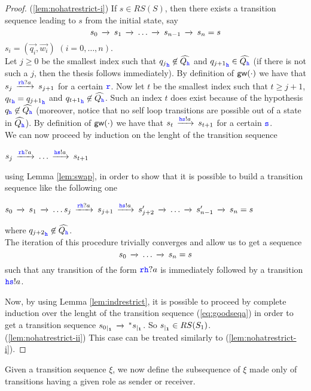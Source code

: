 \begin{proof}
(\ref{lem:nohatrestrict-i})
If $s \in RS(S)$, then there exists a transition sequence leading to $s$ from the initial state, say
$$s_0\lts{}s_1\lts{} \ldots\lts{} s_{n-1}\lts{}s_n=s$$
$s_i = (\vec{q_i},\vec{w_i})$ $(i=0,\ldots,n)$.\\
Let $j \geq 0$ be the smallest index such that ${q_j}_\HH\not\in \widehat{Q_\HH}$ and  ${q_{j+1}}_\HH\in \widehat{Q_\HH}$
(if there is not such a $j$, then the thesis follows immediately).
By definition of $\gateway{\cdot}$ we have that $s_j\lts{\ttr\HH?a} s_{j+1}$ for a certain $\ttr$.
Now let $t$ be the smallest index such that  $t\geq j+1$, ${q_t}_\HH = {q_{j+1}}_\HH$ and ${q_{t+1}}_\HH\not\in \widehat{Q_\HH}$.
Such an index $t$ does exist because of the hypothesis $q_\HH\not\in\widehat{Q_\HH}$
(moreover, notice that no self loop transitions are possible out of a state in $\widehat{Q_\HH}$).
By definition of $\gateway{\cdot}$ we have that $s_{t}\lts{\HH\tts!a} s_{t+1}$ for a certain $\tts$.\\
We can now proceed by induction on the lenght of the transition sequence
\centerline{
$s_j\lts{\ttr\HH?a} \ldots \lts{\HH\tts!a}s_{t+1}$
}
using Lemma \ref{lem:swap}, in order to show that 
it is possible to build a transition sequence like the following one\\
\centerline{
$s_0\lts{}s_1\lts{}\ldots s_j\lts{\ttr\HH?a} s_{j+1}\lts{\HH\tts!a} s'_{j+2} \lts{} \ldots \lts{}s'_{n-1}\lts{}s_n=s$
}
where ${q_{j+2}}_\HH\not\in \widehat{Q_\HH}$.\\
The iteration of this procedure trivially converges and allow us to get a sequence
\\
\begin{equation}
\label{eq:goodseqa}
s_0\lts{}\ldots  \lts{}s_n=s
\end{equation}
such that any transition of the form $\ttr\HH?a$ is immediately followed by a transition $\HH\tts!a$.

Now, by using Lemma \ref{lem:indrestrict}, it is possible to proceed by complete induction over the 
lenght of the transition sequence (\ref{eq:goodseqa})
in order to get a transition sequence $\restrict{s_0}{1} \lts{}^* \restrict{s}{1}$. So $\restrict{s}{1}\in RS(S_1)$.\\
(\ref{lem:nohatrestrict-ii}) This case can be treated similarly to (\ref{lem:nohatrestrict-i}).
\end{proof}


Given a transition sequence $\xi$, we now define the subsequence of $\xi$ made only
of transitions having a given role as
sender or receiver.


